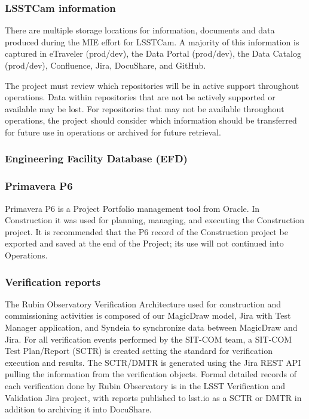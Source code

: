 \subsubsection{LSSTCam information}

There are multiple storage locations for information, documents and data produced during the MIE effort for LSSTCam.
A majority of this information is captured in eTraveler (prod/dev), the Data Portal (prod/dev), the Data Catalog (prod/dev), Confluence, Jira, DocuShare, and GitHub.

The project must review which repositories will be in active support throughout operations.
Data within repositories that are not be actively supported or available may be lost.
For repositories that may not be available throughout operations, the project should consider which information should be transferred for future use in operations or archived for future retrieval.

\subsubsection{Engineering Facility Database (EFD)}



\subsubsection{Primavera P6}

Primavera P6 is a Project Portfolio management tool from Oracle. 
In Construction it was used for planning, managing, and executing the Construction project. 
It is recommended that the P6 record of the Construction project be exported and saved at the end of the Project;  its use will not continued into Operations. 


\subsubsection{Verification reports}

The Rubin Observatory Verification Architecture used for construction and commissioning activities is composed of our MagicDraw model, Jira with Test Manager application, and Syndeia to synchronize data between MagicDraw and Jira.
For all verification events performed by the SIT-COM team, a SIT-COM Test Plan/Report (SCTR) is created setting the standard for verification execution and results.
The SCTR/DMTR is generated using the Jira REST API pulling the information from the verification objects.
Formal detailed records of each verification done by Rubin Observatory is in the LSST Verification and Validation Jira project, with reports published to lsst.io as a SCTR or DMTR in addition to archiving it into DocuShare.

